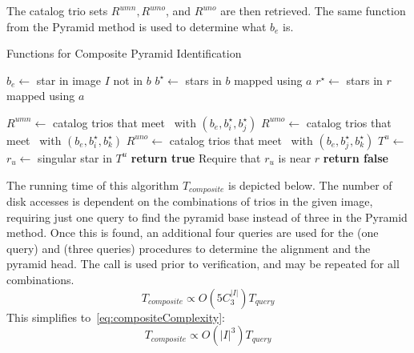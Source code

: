The catalog trio sets $R^{umn}, R^{umo}$, and $R^{uno}$ are then retrieved.
The same function  from the Pyramid method is used to determine what $b_e$ is.
\begin{algorithm}
    \caption{Functions for Composite Pyramid Identification} \label{algorithm:compositePyramidHelpers}
    \begin{algorithmic}[1]
        \State $b_e \gets $ star in image $I$ not in $b$
        \State $b^{\star} \gets $ stars in $b$ mapped using $a$
        \State $r^{\star} \gets $ stars in $r$ mapped using $a$

        \State $R^{umn} \gets $ catalog trios that meet~ with $(b_e, b^{\star}_i,
        b^{\star}_j)$
        \State $R^{umo} \gets $ catalog trios that meet~ with $(b_e, b^{\star}_i,
        b^{\star}_k)$
        \State $R^{uno} \gets $ catalog trios that meet~ with $(b_e, b^{\star}_j,
        b^{\star}_k)$
        \State $T^u \gets $ 
        \\
        \State $r_u \gets $ singular star in $T^u$
        \State \textbf{return true} \Comment Require that $r_u$ is near $r$
        \EndIf
        \EndIf
        \State \textbf{return false}
        \EndFunction
    \end{algorithmic}
\end{algorithm}

The running time of this algorithm $T_{composite}$ is depicted below.
The number of disk accesses is dependent on the combinations of trios in the given image, requiring just one query to
find the pyramid base instead of three in the Pyramid method.
Once this is found, an additional four queries are used for the  (one query) and
 (three queries) procedures to determine the alignment and the pyramid head.
The  call is used prior to verification, and may be repeated for all combinations.
\begin{equation}\label{eq:compositeComplexityPart1}
    T_{composite} \propto O\left( 5C^{|I|}_3 \right) T_{query}
\end{equation}
This simplifies to~\autoref{eq:compositeComplexity}:
\begin{equation}\label{eq:compositeComplexity}
    T_{composite} \propto O\left( |I|^3 \right) T_{query}
\end{equation}

\begin{table*}[ht]
\end{table*}